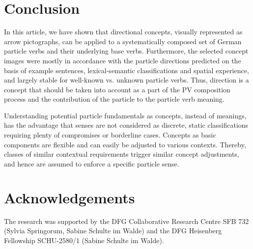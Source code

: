 \documentclass[output=paper]{langsci/langscibook}
\begin{document}
\section{Conclusion}

In this article, we have shown that directional concepts, visually
represented as arrow pictographs, can be applied to a systematically
composed set of German particle verbs and their underlying base
verbs. Furthermore, the selected concept images were mostly in
accordance with the particle directions predicted on the basis of
example sentences, lexical-semantic classifications and spatial
experience, and largely stable for well-known vs. unknown particle
verbs. Thus, direction is a concept that should be taken into account
as a part of the PV composition process and the contribution of the
particle to the particle verb meaning.

Understanding potential particle fundamentals as concepts, instead of
meanings, has the advantage that senses are not considered as
discrete, static classifications requiring plenty of compromises or
borderline cases. Concepts as basic components are flexible and can
easily be adjusted to various contexts. Thereby, classes of similar
contextual requirements trigger similar concept adjustments, and hence
are assumed to enforce a specific particle sense.


%
%
%
%


\section*{Acknowledgements}

The research was supported by the DFG Collaborative Research Centre
SFB 732 (Sylvia Springorum, Sabine Schulte im Walde) and the DFG
Heisenberg Fellowship SCHU-2580/1 (Sabine Schulte im Walde).
\end{document}
